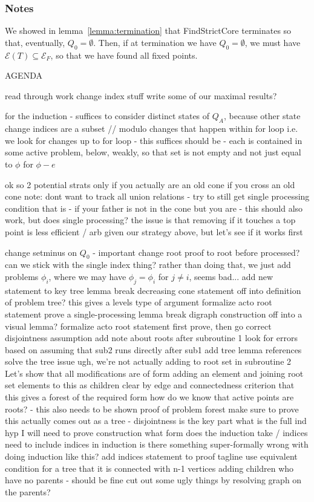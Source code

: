 \documentclass[11pt,reqno]{amsart}
\theoremstyle{definition}
\numberwithin{equation}{section}
\newcommand{\pre}{\phi}
\newcommand{\sub}{\subseteq}
\newcommand{\fix}{\mathcal{E}}
\newcommand{\acto}{Q_0}
\newcommand{\acta}{Q_A}
\newcommand{\fixfind}{\mathcal{E}_F}
\begin{document}
\begin{enumerate}
\subsubsection{Notes}

We showed in lemma~\ref{lemma:termination} that FindStrictCore terminates so that, eventually, $\acto = \emptyset$.
Then, if at termination we have $\acto = \emptyset$, we must have $\fix(T) \sub \fixfind$, so that we have found all fixed points.




AGENDA

read through work 
change index stuff 
write some of our maximal results?


for the induction - suffices to consider distinct states of $\acta$, because other state change indices are a subset // modulo changes that happen within for loop i.e. we look for changes up to for loop - this suffices
    should be - each is contained in some active problem, below, weakly, so that set is not empty and not just equal to $\pre$ for $\pre - e$

ok so 2 potential strats
    only if you actually are an old cone 
    if you cross an old cone 
        note: dont want to track all union relations - try to still get single processing condition
        that is - if your father is not in the cone but you are - this should also work, but does single processing? 
        the issue is that removing if it touches a top point is less efficient / arb given our strategy above, but let's see if it works first 

change setminus on $\acto$ - important 
change root proof to root before processed? 
can we stick with the single index thing? 
rather than doing that, we just add problems $\pre_i$, where we may have $\pre_j = \pre_i$ for $j \not = i$, seems bad...
add new statement to key tree lemma
break decreasing cone statement off into definition of problem tree? 
this gives a levels type of argument 
formalize acto root statement
prove a single-processing lemma 
break digraph construction off into a visual lemma? 
formalize acto root statement 
first prove, then go correct disjointness assumption
add note about roots after subroutine 1 
look for errors based on assuming that sub2 runs directly after sub1
add tree lemma references
solve the tree issue
ugh, we're not actually adding to root set in subroutine 2 
Let's show that all modifications are of form
    adding an element and joining root set elements to this as children 
    clear by edge and connectedness criterion that this gives a forest of the required form 
how do we know that active points are roots? - this also needs to be shown
proof of problem forest
make sure to prove this actually comes out as a tree - disjointness is the key part
what is the full ind hyp I will need to prove construction 
what form does the induction take / indices
need to include indices in induction
is there something super-formally wrong with doing induction like this? 
add indices statement to proof tagline
use equivalent condition for a tree that it is connected with n-1 vertices
adding children who have no parents - should be fine 
cut out some ugly things by resolving graph on the parents? 


\end{enumerate}
\end{document}
